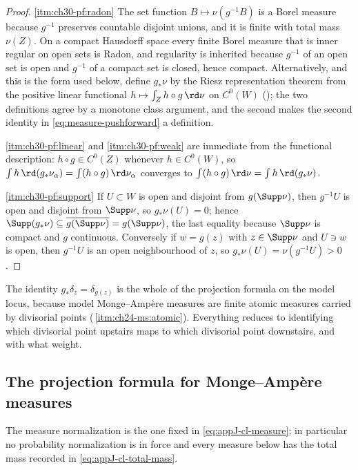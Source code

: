 \begin{proof}
\cref{itm:ch30-pf:radon}  The set function \(B\mapsto\nu(g^{-1}B)\) is a
Borel measure because \(g^{-1}\) preserves countable disjoint unions, and it
is finite with total mass \(\nu(Z)\).  On a compact Hausdorff space every
finite Borel measure that is inner regular on open sets is Radon, and
regularity is inherited because \(g^{-1}\) of an open set is open and
\(g^{-1}\) of a compact set is closed, hence compact.  Alternatively, and
this is the form used below, define \(g_*\nu\) by the Riesz representation
theorem from the positive linear functional
\(h\mapsto\int_Z h\circ g\,\rd\nu\) on \(C^0(W)\)
(); the two definitions agree by a monotone class
argument, and the second makes the second identity in
\eqref{eq:measure-pushforward} a definition.

\cref{itm:ch30-pf:linear} and \cref{itm:ch30-pf:weak} are immediate from the
functional description: \(h\circ g\in C^0(Z)\) whenever \(h\in C^0(W)\), so
\(\int h\,\rd(g_*\nu_\alpha)=\int(h\circ g)\,\rd\nu_\alpha\) converges to
\(\int(h\circ g)\,\rd\nu=\int h\,\rd(g_*\nu)\).

\cref{itm:ch30-pf:support}  If \(U\subset W\) is open and disjoint from
\(g(\Supp\nu)\), then \(g^{-1}U\) is open and disjoint from \(\Supp\nu\), so
\(g_*\nu(U)=0\); hence \(\Supp(g_*\nu)\subseteq\overline{g(\Supp\nu)}
=g(\Supp\nu)\), the last equality because \(\Supp\nu\) is compact and \(g\)
continuous.  Conversely if \(w=g(z)\) with \(z\in\Supp\nu\) and \(U\ni w\)
is open, then \(g^{-1}U\) is an open neighbourhood of \(z\), so
\(g_*\nu(U)=\nu(g^{-1}U)>0\).
\end{proof}

The identity \(g_*\delta_z=\delta_{g(z)}\) is the whole of the projection
formula on the model locus, because model Monge--Amp\`ere measures are finite
atomic measures carried by divisorial points
(\,\cref{itm:ch24-ms:atomic}).  Everything
reduces to identifying which divisorial point upstairs maps to which
divisorial point downstairs, and with what weight.

\subsection{The projection formula for Monge--Amp\`ere measures}
\label{sec:ch30-finite-projection}

The measure normalization is the one fixed in \eqref{eq:appJ-cl-measure};
in particular no probability normalization is in force and every measure
below has the total mass recorded in \eqref{eq:appJ-cl-total-mass}.

